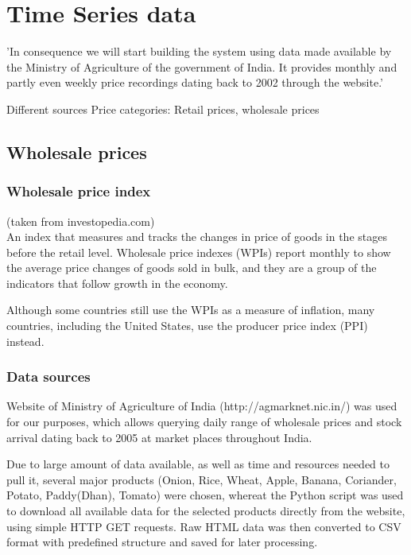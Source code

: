 \section*{Time Series data}

'In consequence we will start building the system using data made available by the Ministry of Agriculture of the government of India. It provides monthly and partly even weekly price recordings dating back to 2002 through the website.'


Different sources
Price categories: Retail prices, wholesale prices

\subsection*{Wholesale prices}

\subsubsection*{Wholesale price index}
(taken from investopedia.com)\\
An index that measures and tracks the changes in price of goods in the stages before the retail level. Wholesale price indexes (WPIs) report monthly to show the average price changes of goods sold in bulk, and they are a group of the indicators that follow growth in the economy.\par
Although some countries still use the WPIs as a measure of inflation, many countries, including the United States, use the producer price index (PPI) instead.\par

\subsubsection*{Data sources}
Website of Ministry of Agriculture of India (http://agmarknet.nic.in/) was used for our purposes, which allows querying daily range of wholesale prices and stock arrival dating back to 2005 at market places throughout India.

Due to large amount of data available, as well as time and resources needed to pull it, several major products (Onion, Rice, Wheat, Apple, Banana, Coriander, Potato, Paddy(Dhan), Tomato) were chosen, whereat the Python script was used to download all available data for the selected products directly from the website, using simple HTTP GET requests. Raw HTML data was then converted to CSV format with predefined structure and saved for later processing.

